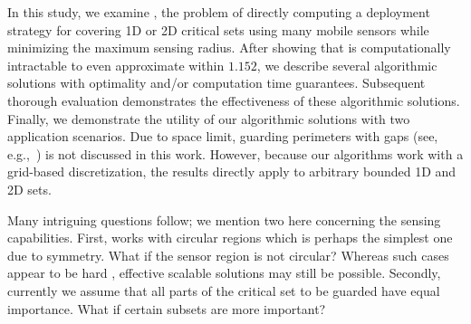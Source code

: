 In this study, we examine \osgt, the problem of directly computing a deployment 
strategy for covering 1D or 2D critical sets using many mobile sensors while 
minimizing the maximum sensing radius. After showing that \osgt is computationally 
intractable to even approximate within $1.152$, we describe several 
algorithmic solutions with optimality and/or computation time guarantees. 
Subsequent thorough evaluation demonstrates the effectiveness of these algorithmic 
solutions. Finally, we demonstrate the utility of our algorithmic solutions with 
two application scenarios. 
%
Due to space limit, guarding perimeters with gaps (see, e.g.,~\cite{FenHanGaoYuRSS19}) 
is not discussed in this work. However, because our algorithms work with a 
grid-based discretization, the results directly apply to arbitrary bounded 1D and 2D 
sets. 

Many intriguing questions follow; we mention two here concerning the sensing 
capabilities. First, \osgt works with circular regions which is perhaps the simplest one
due to symmetry. What if the sensor region is not circular? Whereas such cases 
appear to be hard \cite{culberson1988covering}, effective scalable solutions may 
still be possible. Secondly, currently we assume that all parts of the critical 
set to be guarded have equal importance. What if certain subsets are more important? 


